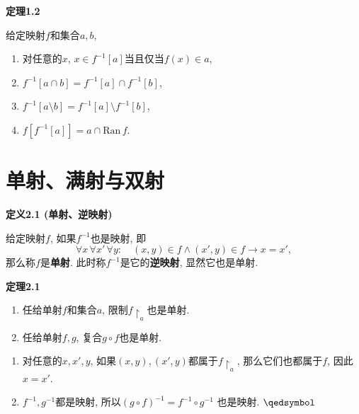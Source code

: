 \documentclass[UTF8]{ctexart}
\begin{document}
\vspace{10pt}

\hypertarget{sec:定理1.2}{}
\noindent\textbf{定理1.2}

给定映射$f$和集合$a,b$,
\begin{enumerate}
    \item 对任意的$x$, $x\in f^{-1}[a]$当且仅当$f(x)\in a$,
    \item $f^{-1}[a\cap b]=f^{-1}[a]\cap f^{-1}[b]$,
    \item $f^{-1}[a\setminus b]=f^{-1}[a]\setminus f^{-1}[b]$,
    \item $f[f^{-1}[a]]=a\cap\mathrm{Ran}\,f$.
\end{enumerate}





\newpage

\section{单射、满射与双射}

\hypertarget{sec:定义2.1}{}
\noindent\textbf{定义2.1 (单射、逆映射)}

给定映射$f$, 如果$f^{-1}$也是映射, 即
\[
    \forall x\,\forall x'\,\forall y:\quad(x,y)\in f\land(x',y)\in f\to x=x',
\]
那么称$f$是\textbf{单射}. 此时称$f^{-1}$是它的\textbf{逆映射}, 显然它也是单射.

\vspace{10pt}

\hypertarget{sec:定理2.1}{}
\noindent\textbf{定理2.1}

\begin{enumerate}
    \item 任给单射$f$和集合$a$, 限制$f\!\restriction_a$也是单射.
    \item 任给单射$f,g$, 复合$g\circ f$也是单射.
\end{enumerate}


\begin{enumerate}
    \item 对任意的$x,x',y$, 如果$(x,y),(x',y)$都属于$f\!\restriction_a$,
    那么它们也都属于$f$, 因此$x=x'$.
    \item $f^{-1},g^{-1}$都是映射, 所以$(g\circ f)^{-1}=f^{-1}\circ g^{-1}$
    也是映射. \hfill $\qedsymbol$
\end{enumerate}

\vspace{10pt}
\end{document}
